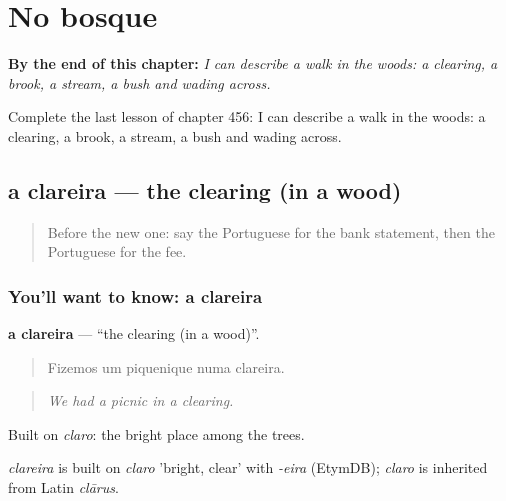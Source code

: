 
\chapter{No bosque}
\label{ch:pt-no-bosque}

\begin{chapteropening}
\textbf{By the end of this chapter:} \emph{I can describe a walk in the woods: a clearing, a brook, a stream, a bush and wading across.}

Complete the last lesson of chapter 456: I can describe a walk in the woods: a clearing, a brook, a stream, a bush and wading across.
\end{chapteropening}

\section[a clareira]{a clareira — the clearing (in a wood)}

\label{lesson:PT-C456-clareira}



\begin{quote}
Before the new one: say the Portuguese for the bank statement, then the Portuguese for the fee.
\end{quote}

\subsection*{You'll want to know: a clareira}
\textbf{a clareira} — \textquotedblleft{}the clearing (in a wood)\textquotedblright{}.

\begin{quote}
Fizemos um piquenique numa clareira.
\end{quote}

\begin{quote}
\emph{We had a picnic in a clearing.}
\end{quote}

Built on \emph{claro}: the bright place among the trees.

\begin{cousinweb}
\emph{clareira} is built on \emph{claro} 'bright, clear' with \emph{-eira} (EtymDB); \emph{claro} is inherited from Latin \emph{clārus}.
\end{cousinweb}

